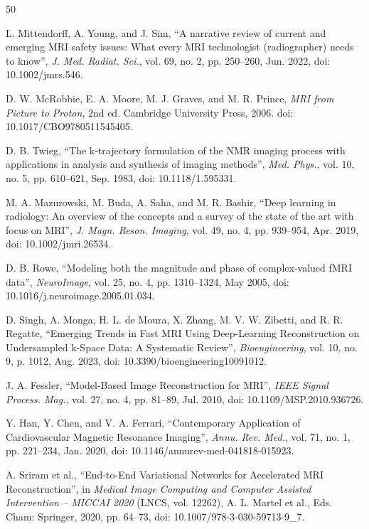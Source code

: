 \documentclass[12pt,a4paper]{article}
\begin{document}
\newpage
{}
\begin{thebibliography}{50}

L. Mittendorff, A. Young, and J. Sim, ``A narrative review of current and emerging MRI safety issues: What every MRI technologist (radiographer) needs to know'', \textit{J. Med. Radiat. Sci.}, vol. 69, no. 2, pp. 250–260, Jun. 2022, doi: 10.1002/jmrs.546.

D. W. McRobbie, E. A. Moore, M. J. Graves, and M. R. Prince, \textit{MRI from Picture to Proton}, 2nd ed. Cambridge University Press, 2006. doi: 10.1017/CBO9780511545405.

D. B. Twieg, ``The k‐trajectory formulation of the NMR imaging process with applications in analysis and synthesis of imaging methods'', \textit{Med. Phys.}, vol. 10, no. 5, pp. 610–621, Sep. 1983, doi: 10.1118/1.595331.

M. A. Mazurowski, M. Buda, A. Saha, and M. R. Bashir, ``Deep learning in radiology: An overview of the concepts and a survey of the state of the art with focus on MRI'', \textit{J. Magn. Reson. Imaging}, vol. 49, no. 4, pp. 939–954, Apr. 2019, doi: 10.1002/jmri.26534.

D. B. Rowe, ``Modeling both the magnitude and phase of complex-valued fMRI data'', \textit{NeuroImage}, vol. 25, no. 4, pp. 1310–1324, May 2005, doi: 10.1016/j.neuroimage.2005.01.034.

D. Singh, A. Monga, H. L. de Moura, X. Zhang, M. V. W. Zibetti, and R. R. Regatte, ``Emerging Trends in Fast MRI Using Deep-Learning Reconstruction on Undersampled k-Space Data: A Systematic Review'', \textit{Bioengineering}, vol. 10, no. 9, p. 1012, Aug. 2023, doi: 10.3390/bioengineering10091012.

J. A. Fessler, ``Model-Based Image Reconstruction for MRI'', \textit{IEEE Signal Process. Mag.}, vol. 27, no. 4, pp. 81–89, Jul. 2010, doi: 10.1109/MSP.2010.936726.

Y. Han, Y. Chen, and V. A. Ferrari, ``Contemporary Application of Cardiovascular Magnetic Resonance Imaging'', \textit{Annu. Rev. Med.}, vol. 71, no. 1, pp. 221–234, Jan. 2020, doi: 10.1146/annurev-med-041818-015923.

A. Sriram et al., ``End-to-End Variational Networks for Accelerated MRI Reconstruction'', in \textit{Medical Image Computing and Computer Assisted Intervention – MICCAI 2020} (LNCS, vol. 12262), A. L. Martel et al., Eds. Cham: Springer, 2020, pp. 64–73, doi: 10.1007/978-3-030-59713-9\_7.


\end{thebibliography}
\end{document}
